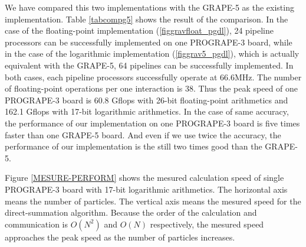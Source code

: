 \documentclass{llncs}
\begin{document}
We have compared this two implementations with the GRAPE-5 as the
existing implementation.  Table \ref{tabcompg5} shows the result of
the comparison.  In the case of the floating-point implementation
(\ref{figgravfloat_pgdl}), 24 pipeline processors can be successfully
implemented on one PROGRAPE-3 board, while in the case of the
logarithmic implementation (\ref{figgrav5_pgdl}), which is actually
equivalent with the GRAPE-5, 64 pipelines can be successfully
implemented.  In both cases, each pipeline processors successfully
operate at 66.6MHz.  The number of floating-point operations per one
interaction is 38.  Thus the peak speed of one PROGRAPE-3 board is
60.8 Gflops with 26-bit floating-point arithmetics and 162.1 Gflops
with 17-bit logarithmic arithmetics.
In the case of same accuracy, the performance of our implementation on one PROGRAPE-3
board is five times faster than one GRAPE-5 board.  And even if we use
twice the accuracy, the performance of our implementation is the still
two times good than the GRAPE-5.

Figure \ref{MESURE-PERFORM} shows the mesured calculation speed of
single PROGRAPE-3 board with 17-bit logarithmic arithmetics.  The
horizontal axis means the number of particles.  The vertical axis
means the mesured speed for the direct-summation algorithm.  Because
the order of the calculation and communication is $O(N^2)$ and $O(N)$
respectively, the mesured speed approaches the peak speed as the
number of particles increases.
\end{document}
